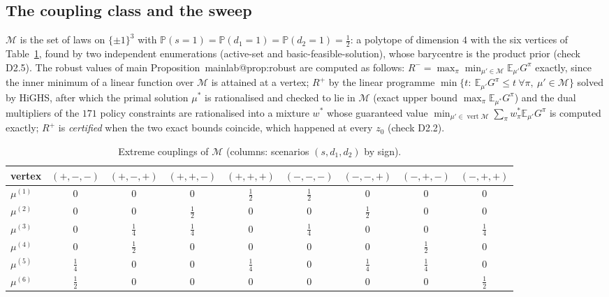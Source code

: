 \documentclass[11pt,a4paper]{article}
\makeatletter
\theoremstyle{plain}
\theoremstyle{definition}
\theoremstyle{remark}
\newcommand{\E}{\mathbb{E}}
\newcommand{\Prob}{\mathbb{P}}
\newcommand{\calM}{\mathcal{M}}
\newcommand{\tfr}[2]{\tfrac{#1}{#2}}
\newcommand{\mref}[1]{\csname mainlab@#1\endcsname}
\makeatother
\begin{document}
\subsection{The coupling class and the sweep}
$\calM$ is the set of laws on $\{\pm1\}^3$ with $\Prob(s=1)=\Prob(d_1=1)=\Prob(d_2=1)=\tfr12$: a polytope of dimension $4$ with the six vertices of Table~\ref{tab:vertices}, found by two independent enumerations (active-set and basic-feasible-solution), whose barycentre is the product prior (check D2.5). The robust values of main Proposition~\mref{prop:robust} are computed as follows: $R^-=\max_\pi\min_{\mu'\in\calM}\E_{\mu'}G^\pi$ exactly, since the inner minimum of a linear function over $\calM$ is attained at a vertex; $R^+$ by the linear programme $\min\{t:\ \E_{\mu'}G^\pi\le t\ \forall\pi,\ \mu'\in\calM\}$ solved by HiGHS, after which the primal solution $\mu^\ast$ is rationalised and checked to lie in $\calM$ (exact upper bound $\max_\pi\E_{\mu^\ast}G^\pi$) and the dual multipliers of the $171$ policy constraints are rationalised into a mixture $w^\ast$ whose guaranteed value $\min_{\mu'\in\operatorname{vert}\calM}\sum_\pi w^\ast_\pi\E_{\mu'}G^\pi$ is computed exactly; $R^+$ is \emph{certified} when the two exact bounds coincide, which happened at every $z_0$ (check D2.2).

\begin{table}[H]
\centering\small
\caption{Extreme couplings of $\calM$ (columns: scenarios $(s,d_1,d_2)$ by sign).}
\label{tab:vertices}
\begin{tabular}{lcccccccc}
\toprule
vertex & $(+,-,-)$ & $(+,-,+)$ & $(+,+,-)$ & $(+,+,+)$ & $(-,-,-)$ & $(-,-,+)$ & $(-,+,-)$ & $(-,+,+)$\\ \midrule
$\mu^{(1)}$ & $0$ & $0$ & $0$ & $\tfrac{1}{2}$ & $\tfrac{1}{2}$ & $0$ & $0$ & $0$\\
$\mu^{(2)}$ & $0$ & $0$ & $\tfrac{1}{2}$ & $0$ & $0$ & $\tfrac{1}{2}$ & $0$ & $0$\\
$\mu^{(3)}$ & $0$ & $\tfrac{1}{4}$ & $\tfrac{1}{4}$ & $0$ & $\tfrac{1}{4}$ & $0$ & $0$ & $\tfrac{1}{4}$\\
$\mu^{(4)}$ & $0$ & $\tfrac{1}{2}$ & $0$ & $0$ & $0$ & $0$ & $\tfrac{1}{2}$ & $0$\\
$\mu^{(5)}$ & $\tfrac{1}{4}$ & $0$ & $0$ & $\tfrac{1}{4}$ & $0$ & $\tfrac{1}{4}$ & $\tfrac{1}{4}$ & $0$\\
$\mu^{(6)}$ & $\tfrac{1}{2}$ & $0$ & $0$ & $0$ & $0$ & $0$ & $0$ & $\tfrac{1}{2}$\\
\bottomrule
\end{tabular}
\end{table}
\end{document}
